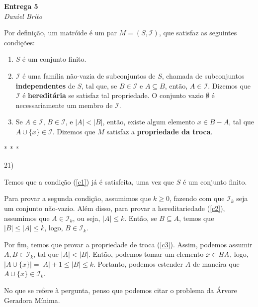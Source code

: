 \documentclass[]{article}
\begin{document}
\begin{center}
  \Large\textbf{Entrega 5}\\
  \large\textit{Daniel Brito}
\end{center}

Por definição, um matróide é um par $M = (S, \mathcal I)$, que satisfaz as seguintes condições:

\begin{enumerate}
    \item \label{c1} $S$ é um conjunto finito.
    \item \label{c2} $\mathcal I$ é uma família não-vazia de subconjuntos de $S$, chamada de subconjuntos \textbf{independentes} de $S$, tal que, se $B \in \mathcal I$ e $A \subseteq B$, então, $A \in \mathcal I$. Dizemos que $\mathcal I$ é \textbf{hereditária} se satisfaz tal propriedade. O conjunto vazio $\emptyset$ é necessariamente um membro de $\mathcal I$.
    \item \label{c3} Se $A \in \mathcal I$, $B \in \mathcal I$, e $|A| < |B|$, então, existe algum elemento $x \in B - A$, tal que $A \cup \{x\} \in \mathcal I$. Dizemos que $M$ satisfaz a \textbf{propriedade da troca}.
\end{enumerate}

\begin{center}
    * * *
\end{center}

21) 

Temos que a condição (\ref{c1}) já é satisfeita, uma vez que $S$ é um conjunto finito. 

Para provar a segunda condição, assumimos que $k \geq 0$, fazendo com que $\mathcal I_k$ seja um conjunto não-vazio. Além disso, para provar a hereditariedade (\ref{c2}), assumimos que $A \in \mathcal I_k$, ou seja, $|A| \leq k$. Então, se $B \subseteq A$, temos que $|B| \leq |A| \leq k$, logo, $B \in \mathcal I_k$. 

Por fim, temos que provar a propriedade de troca (\ref{c3}). Assim, podemos assumir $A, B \in \mathcal I_k$, tal que $|A| < |B|$. Então, podemos tomar um elemento $x \in B\\A$, logo, $|A \cup \{x\}| = |A| + 1 \leq |B| \leq k$. Portanto, podemos estender $A$ de maneira que $A \cup \{x\} \in \mathcal I_k$.

\vspace{0.5cm}

No que se refere à pergunta, penso que podemos citar o problema da Árvore Geradora Mínima.
\end{document}

